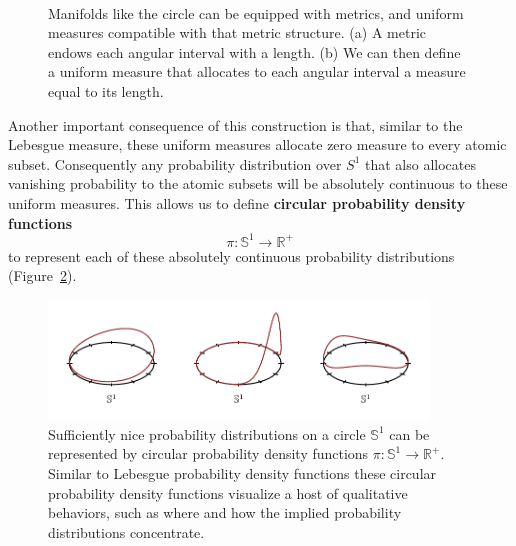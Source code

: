 \documentclass[
  letterpaper,
  DIV=11,
  numbers=noendperiod]{scrartcl}
\begin{document}
\begin{figure}
\begin{minipage}[t]{0.35\linewidth}
{{}

}

\subcaption{\label{fig-circle-measure}}
\end{minipage}%
%
\begin{minipage}[t]{0.15\linewidth}

{\centering 

~

}

\end{minipage}%

\caption{\label{fig-circle}Manifolds like the circle can be equipped
with metrics, and uniform measures compatible with that metric
structure. (a) A metric endows each angular interval with a length. (b)
We can then define a uniform measure that allocates to each angular
interval a measure equal to its length.}

\end{figure}

Another important consequence of this construction is that, similar to
the Lebesgue measure, these uniform measures allocate zero measure to
every atomic subset. Consequently any probability distribution over
\(S^{1}\) that also allocates vanishing probability to the atomic
subsets will be absolutely continuous to these uniform measures. This
allows us to define \textbf{circular probability density functions} \[
\pi : \mathbb{S}^{1} \rightarrow \mathbb{R}^{+}
\] to represent each of these absolutely continuous probability
distributions (Figure~\ref{fig-circular-density-functions}).

\begin{figure}

{\centering \includegraphics[width=0.9\textwidth,height=\textheight]{figures/circular_density_functions/circular_density_functions.pdf}

}

\caption{\label{fig-circular-density-functions}Sufficiently nice
probability distributions on a circle \(\mathbb{S}^{1}\) can be
represented by circular probability density functions
\(\pi : \mathbb{S}^{1} \rightarrow \mathbb{R}^{+}\). Similar to Lebesgue
probability density functions these circular probability density
functions visualize a host of qualitative behaviors, such as where and
how the implied probability distributions concentrate.}

\end{figure}
\end{document}
